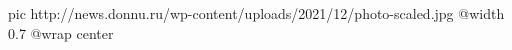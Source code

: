  
 
 
 
 

\ifcmt
  pic http://news.donnu.ru/wp-content/uploads/2021/12/photo-scaled.jpg
  @width 0.7
	@wrap center
\fi
